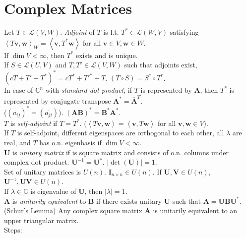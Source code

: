 \documentclass{article}
\theoremstyle{definition}
\begin{document}
\section{Complex Matrices}
Let $T\in\mathscr{L}(V,W)$. \textit{Adjoint} of $T$ is l.t. $T^{*}\in\mathscr{L}(W,V)$ satisfying $\left<T\mathbf{v},\mathbf{w}\right>_{W}=\left<\mathbf{v},T^{*}\mathbf{w}\right>$ for all $\mathbf{v}\in V,\mathbf{w}\in W$.\\
If $\dim{V}<\infty$, then $T^{*}$ exists and is unique.\\
If $S\in\mathscr{L}(U,V)$ and $T,T'\in\mathscr{L}(V,W)$ such that adjoints exist, $(cT+T'+T^{*})^{*}=cT^{*}+T'^{*}+T$. $(T\circ S)=S^{*}\circ T^{*}$.\\
In case of $\mathbb{C}^{n}$ with \textit{standard dot product}, if $T$ is represented by $\mathbf{A}$, then $T^{*}$ is represented by conjugate transpose $\mathbf{A}^{*}=\overline{\mathbf{A}}^{T}$.\\ ($(a_{ij})^{*}=(\overline{a_{ji}})$). $(\mathbf{AB})^{*}=\mathbf{B}^{*}\mathbf{A}^{*}$.\\
$T$ is \textit{self-adjoint} if $T=T^{*}$. ($\left<T\mathbf{v},\mathbf{w}\right>=\left<\mathbf{v},T\mathbf{w}\right>$ for all $\mathbf{v},\mathbf{w}\in V$).\\
If $T$ is self-adjoint, different eigenspaces are orthogonal to each other, all $\lambda$ are real, and $T$ has o.n. eigenbasis if $\dim V<\infty$.\\
$\mathbf{U}$ is \textit{unitary matrix} if is square matrix and consists of o.n. columns under complex dot product. $\mathbf{U}^{-1}=\mathbf{U}^{*}$. $\left|\det(\mathbf{U})\right|=1$.\\
Set of unitary matrices is $U(n)$.
$\mathbf{I}_{n\times n}\in U(n)$. If $\mathbf{U},\mathbf{V}\in U(n)$, $\mathbf{U}^{-1},\mathbf{UV}\in U(n)$.\\
If $\lambda\in\mathbb{C}$ is eigenvalue of $\mathbf{U}$, then $\left|\lambda\right|=1$.\\
$\mathbf{A}$ is \textit{unitarily equivalent} to $\mathbf{B}$ if there exists unitary $\mathbf{U}$ such that $\mathbf{A}=\mathbf{UBU}^{*}$.\\
(Schur's Lemma) Any complex square matrix $\mathbf{A}$ is unitarily equivalent to an upper triangular matrix.\\
Steps:
\end{document}

